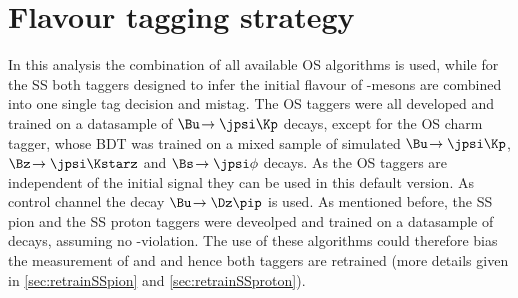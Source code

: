 \section{Flavour tagging strategy}
\label{sec:taggingstrategy}

In this analysis the combination of all available OS algorithms is used, while for the SS both taggers designed to infer the initial flavour of \Bz-mesons are combined into one single tag decision and mistag.
The OS taggers were all developed and trained on a datasample of $\Bu\!\to\jpsi\Kp$ decays, except for the OS charm tagger, whose BDT was trained on a mixed sample of simulated $\Bu\!\to\jpsi\Kp$, $\Bz\!\to\jpsi\Kstarz$ and $\Bs\!\to\jpsi\phi$ decays.
As the OS taggers are independent of the initial signal \B they can be used in this default version.
As control channel the decay $\Bu\!\to\Dz\pip$ is used.
As mentioned before, the SS pion and the SS proton taggers were deveolped and trained on a datasample of \BdToDpi decays, assuming no \CP-violation.
The use of these algorithms could therefore bias the measurement of \Sf and \Sfbar and hence both taggers are retrained (more details given in \cref{sec:retrainSSpion} and \cref{sec:retrainSSproton}).

